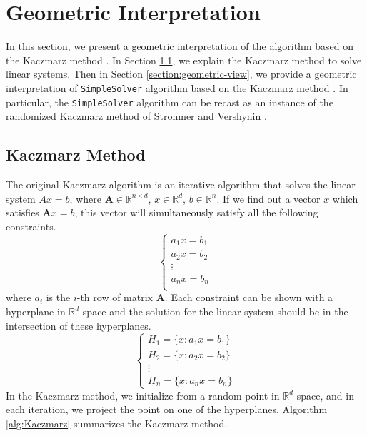 \section{Geometric Interpretation}\label{sec:geom}
In this section, we present a geometric interpretation of the algorithm based on the Kaczmarz method \cite{kaczmarz1937}. In Section \ref{section:kaczmar-method}, we explain the Kaczmarz method \cite{kaczmarz1937} to solve linear systems. Then in Section \ref{section:geometric-view}, we provide a geometric interpretation of \texttt{SimpleSolver} algorithm based on the Kaczmarz method \cite{kaczmarz1937}. In particular, the \texttt{SimpleSolver} algorithm can be recast as an instance of the randomized Kaczmarz method of Strohmer and Vershynin \cite{Strohmer2007}.

\subsection{Kaczmarz Method}
\label{section:kaczmar-method}
The original Kaczmarz algorithm is an iterative algorithm that solves the linear system $Ax = b$, where $\mathbf{A} \in \mathds{R}^{n \times d}$, $x \in \mathds{R}^d$, $b \in \mathds{R}^n$. If we find out a vector $x$ which satisfies $\mathbf{A}x=b$, this vector will simultaneously satisfy all the following constraints.
\begin{equation}
    \begin{cases}
            a_1 x =b_1 \\
            a_2 x =b_2 \\
            \vdots \\
            a_n x =b_n \\
    \end{cases}
\end{equation}
where $a_i$ is the $i$-th row of matrix $\mathbf{A}$. Each constraint can be shown with a hyperplane in $\mathds{R}^d$ space and the solution for the linear system should be in the intersection of these hyperplanes.
\begin{equation}
    \label{eq:hyperplanes}
    \begin{cases}
        H_1 = \{x : a_1 x=b_1\} \\
        H_2 = \{x : a_2 x=b_2\} \\
        \vdots \\
        H_n = \{x : a_n x=b_n\}
    \end{cases}
\end{equation}
In the Kaczmarz method, we initialize from a random point in $\mathds{R}^d$ space, and in each iteration, we project the point on one of the hyperplanes. Algorithm \ref{alg:Kaczmarz} summarizes the Kaczmarz method.

